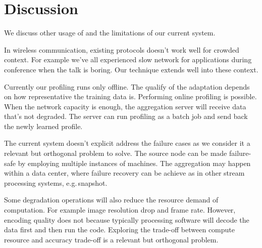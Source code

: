 
\section{Discussion}
\label{sec:discussion}

We discuss other usage of \sysname{} and the limitations of our current system.

 In wireless communication, existing protocols doesn't
work well for crowded context. For example we've all experienced slow network
for applications during conference when the talk is boring. Our technique
extends well into these context.

 Currently our profiling runs only
offline. The qualify of the adaptation depends on how representative the
training data is. Performing online profiling is possible. When the network
capacity is enough, the aggregation server will receive data that's not
degraded. The server can run profiling as a batch job and send back the newly
learned profile.

 The current system doesn't explicit address the
failure cases as we consider it a relevant but orthogonal problem to solve.  The
source node can be made failure-safe by employing multiple instances of
machines. The aggregation may happen within a data center, where failure
recovery can be achieve as in other stream processing systems, e.g.\,snapshot.

 Some degradation operations will also reduce the resource
demand of computation. For example image resolution drop and frame
rate. However, encoding quality does not because typically processing software
will decode the data first and then run the code. Exploring the trade-off
between compute resource and accuracy trade-off is a relevant but orthogonal
problem.


